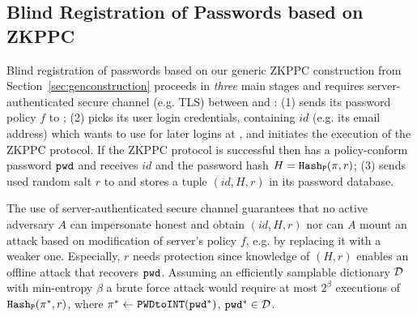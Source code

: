 %


\subsection{Blind Registration of Passwords based on ZKPPC}\label{sec:pwreg}
Blind registration of passwords based on our generic \ac{ZKPPC} construction from Section~\ref{sec:genconstruction} proceeds in \emph{three} main stages and requires server-authenticated secure channel (e.g. TLS) between \Client and \Server: (1) \Server sends its password policy $f$ to \Client; (2) \Client picks its user login credentials, containing $id$ (e.g. its email address) which \Client wants to use for later logins at \Server, and initiates the execution of the \ac{ZKPPC} protocol. If the \ac{ZKPPC} protocol is successful then \Client has a policy-conform password $\mathtt{pwd}$ and \Server receives $id$ and the password hash $H=\mathtt{Hash_P}(\pi,r)$; (3) \Client sends used random salt $r$ to \Server and \Server stores a tuple $(id, H, r)$ in its password database.

The use of server-authenticated secure channel guarantees that no active adversary $A$ can impersonate honest \Server and obtain $(id, H, r)$ nor can $A$ mount an attack based on modification of server's policy $f$, e.g. by replacing it with a weaker one.
Especially, $r$ needs protection since knowledge of $(H, r)$ enables an offline attack that recovers $\mathtt{pwd}$. Assuming an efficiently samplable dictionary $\mathcal{D}$ with min-entropy $\beta$ a brute force attack would require at most $2^\beta$ executions of $\mathtt{Hash_P}(\pi^\ast,r)$, where $\pi^\ast \gets \texttt{PWDtoINT}(\mathtt{pwd}^\ast)$, $\mathtt{pwd}^\ast\in\mathcal{D}$.

